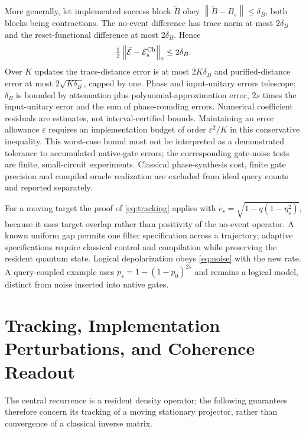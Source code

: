 \documentclass{ieeeaccess}
\newcommand{\norm}[1]{\left\lVert #1\right\rVert}
\newcommand{\eps}{\varepsilon}\newcommand{\tr}{\mathsf T}
\begin{document}
More generally, let implemented success block $\widetilde B$ obey $\norm{\widetilde B-B_s}\le\delta_B$, both blocks being contractions. The no-event difference has trace norm at most $2\delta_B$ and the reset-functional difference at most $2\delta_B$. Hence
\begin{equation}\label{eq:chebimplementation}
\tfrac12\norm{\widetilde\E-\E_s^{\mathrm{Ch}}}_\diamond\le2\delta_B.
\end{equation}
Over $K$ updates the trace-distance error is at most $2K\delta_B$ and purified-distance error at most $2\sqrt{K\delta_B}$, capped by one. Phase and input-unitary errors telescope: $\delta_B$ is bounded by attenuation plus polynomial-approximation error, $2s$ times the input-unitary error and the sum of phase-rounding errors. Numerical coefficient residuals are estimates, not interval-certified bounds. Maintaining an error allowance $\eps$ requires an implementation budget of order $\eps^2/K$ in this conservative inequality. This worst-case bound must not be interpreted as a demonstrated tolerance to accumulated native-gate errors; the corresponding gate-noise tests are finite, small-circuit experiments. Classical phase-synthesis cost, finite gate precision and compiled oracle realization are excluded from ideal query counts and reported separately.

For a moving target the proof of \eqref{eq:tracking} applies with $c_s=\sqrt{1-q(1-\eta_s^2)}$, because it uses target overlap rather than positivity of the no-event operator. A known uniform gap permits one filter specification across a trajectory; adaptive specifications require classical control and compilation while preserving the resident quantum state. Logical depolarization obeys \eqref{eq:noise} with the new rate. A query-coupled example uses $p_s=1-(1-p_0)^{2s}$ and remains a logical model, distinct from noise inserted into native gates.


\section{Tracking, Implementation Perturbations, and Coherence Readout}
The central recurrence is a resident density operator; the following guarantees therefore concern its tracking of a moving stationary projector, rather than convergence of a classical inverse matrix.
\end{document}

